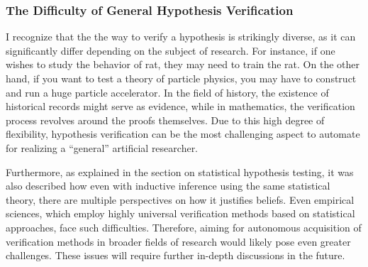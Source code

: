 \documentclass{article}
\begin{document}
\subsubsection{The Difficulty of General Hypothesis Verification}
I recognize that the the way to verify a hypothesis is strikingly diverse, as it can significantly differ depending on the subject of research. For instance, if one wishes to study the behavior of rat, they may need to train the rat. On the other hand, if you want to test a theory of particle physics, you may have to construct and run a huge particle accelerator. In the field of history, the existence of historical records might serve as evidence, while in mathematics, the verification process revolves around the proofs themselves. Due to this high degree of flexibility, hypothesis verification can be the most challenging aspect to automate for realizing a ``general'' artificial researcher.


Furthermore, as explained in the section on statistical hypothesis testing, it was also described how even with inductive inference using the same statistical theory, there are multiple perspectives on how it justifies beliefs. Even empirical sciences, which employ highly universal verification methods based on statistical approaches, face such difficulties. Therefore, aiming for autonomous acquisition of verification methods in broader fields of research would likely pose even greater challenges. These issues will require further in-depth discussions in the future.
\end{document}
